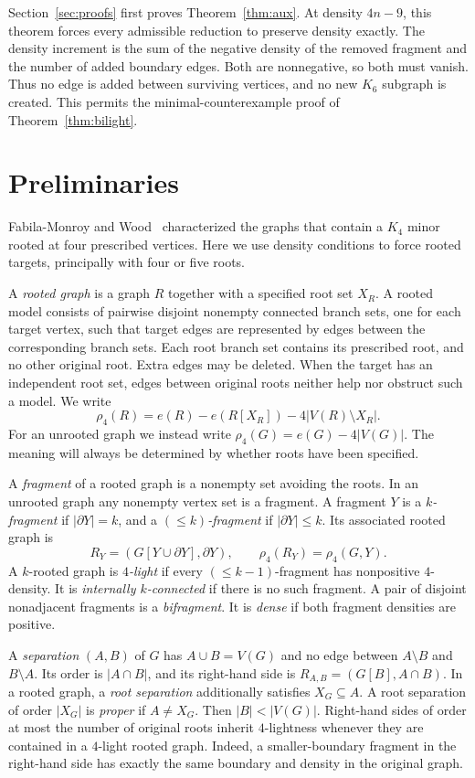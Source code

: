 \documentclass[11pt]{article}
\theoremstyle{remark}
\numberwithin{equation}{section}
\newcommand{\dd}{\partial}
\begin{document}
Section~\ref{sec:proofs} first proves Theorem~\ref{thm:aux}. At density $4n-9$, this theorem forces every admissible reduction to preserve density exactly. The density increment is the sum of the negative density of the removed fragment and the number of added boundary edges. Both are nonnegative, so both must vanish. Thus no edge is added between surviving vertices, and no new $K_6$ subgraph is created. This permits the minimal-counterexample proof of Theorem~\ref{thm:bilight}.

\section{Preliminaries}\label{sec:preliminaries}
Fabila-Monroy and Wood~\cite{FMW13} characterized the graphs that contain a $K_4$ minor rooted at four prescribed vertices. Here we use density conditions to force rooted targets, principally with four or five roots.

A \emph{rooted graph} is a graph $R$ together with a specified root set $X_R$. A rooted model consists of pairwise disjoint nonempty connected branch sets, one for each target vertex, such that target edges are represented by edges between the corresponding branch sets. Each root branch set contains its prescribed root, and no other original root. Extra edges may be deleted. When the target has an independent root set, edges between original roots neither help nor obstruct such a model. We write
\[
\rho_4(R)=e(R)-e(R[X_R])-4|V(R)\setminus X_R|.
\]
For an unrooted graph we instead write $\rho_4(G)=e(G)-4|V(G)|$. The meaning will always be determined by whether roots have been specified.

A \emph{fragment} of a rooted graph is a nonempty set avoiding the roots. In an unrooted graph any nonempty vertex set is a fragment. A fragment $Y$ is a \emph{$k$-fragment} if $|\dd Y|=k$, and a \emph{$(\le k)$-fragment} if $|\dd Y|\le k$. Its associated rooted graph is
\[
R_Y=(G[Y\cup\dd Y],\dd Y),\qquad \rho_4(R_Y)=\rho_4(G,Y).
\]
A $k$-rooted graph is \emph{$4$-light} if every $(\le k-1)$-fragment has nonpositive $4$-density. It is \emph{internally $k$-connected} if there is no such fragment. A pair of disjoint nonadjacent fragments is a \emph{bifragment}. It is \emph{dense} if both fragment densities are positive.

A \emph{separation} $(A,B)$ of $G$ has $A\cup B=V(G)$ and no edge between $A\setminus B$ and $B\setminus A$. Its order is $|A\cap B|$, and its right-hand side is $R_{A,B}=(G[B],A\cap B)$. In a rooted graph, a \emph{root separation} additionally satisfies $X_G\subseteq A$. A root separation of order $|X_G|$ is \emph{proper} if $A\ne X_G$. Then $|B|<|V(G)|$. Right-hand sides of order at most the number of original roots inherit $4$-lightness whenever they are contained in a $4$-light rooted graph. Indeed, a smaller-boundary fragment in the right-hand side has exactly the same boundary and density in the original graph.
\end{document}
